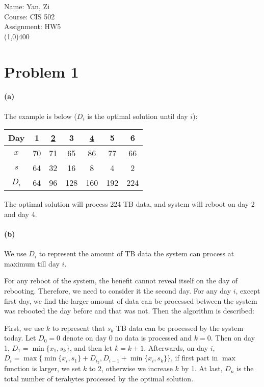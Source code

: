 \documentclass[letter,12pt]{article}
\begin{document}
Name: Yan, Zi \\
Course: CIS 502 \\
Assignment: HW5 \\
\line(1,0){400}

\section*{Problem 1}
\paragraph*{(a)} 
The example is below ($D_i$ is the optimal solution until day $i$):

\begin{tabular}{|c|c|c|c|c|c|c|}
\hline 
Day & 1 & \underline{2} & 3 & \underline{4} & 5 & 6 \\ 
\hline 
$x$ & 70 & 71 & 65 & 86 & 77 & 66 \\ 
\hline 
$s$ & 64 & 32 & 16 & 8 & 4 & 2 \\ 
\hline 
$D_i$ & 64 & 96 & 128 & 160 & 192 & 224 \\ 
\hline 
\end{tabular} 

The optimal solution will process 224 TB data, and system will reboot on day 
2 and day 4.

\paragraph*{(b)}
We use $D_i$ to represent the amount of TB data the system can process at 
maximum till day $i$.

For any reboot of the system, the benefit cannot reveal itself on the day of
rebooting. Therefore, we need to consider it the second day. For any 
day $i$, except first day, we find the larger amount of data can be 
processed between the system was rebooted the day before and that was 
not. Then the algorithm is described:

First, we use $k$ to represent that $s_k$ TB data can be processed by the
system today. Let $D_0 = 0$ denote on day 0 no data is processed and $k 
= 0$. Then on day 1, $D_1 =\min\{x_1, s_k\}$, and then let $k = k+1$.
Afterwards, on day $i$, $D_i = \max\{\min\{x_i, s_1\} + D_{i_2}, D_{i-1} + 
 \min\{x_i, s_k\}\}$, if first part in $\max$ function is larger, we set $k$ to
 2, otherwise we increase $k$ by 1. At last, $D_n$ is the total number of 
 terabytes processed by the optimal solution.
 
\end{document}
